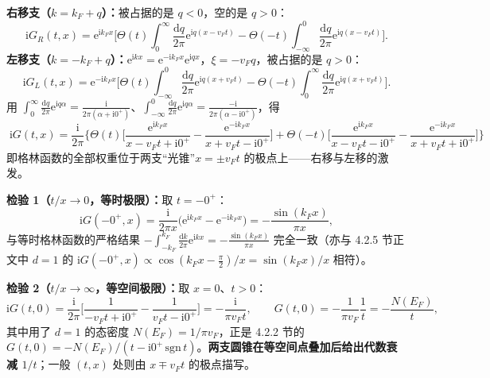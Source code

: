 \textbf{右移支（$k=k_F+q$）：}被占据的是 $q<0$，空的是 $q>0$：
\begin{equation*}
\mathrm{i}G_R(t,x)=\mathrm{e}^{\mathrm{i}k_Fx}\Big[\Theta(t)\!\int_0^\infty\!\frac{\mathrm{d}q}{2\pi}\mathrm{e}^{\mathrm{i}q(x-v_Ft)}
-\Theta(-t)\!\int_{-\infty}^0\!\frac{\mathrm{d}q}{2\pi}\mathrm{e}^{\mathrm{i}q(x-v_Ft)}\Big].
\end{equation*}
\textbf{左移支（$k=-k_F+q$）：}$\mathrm{e}^{\mathrm{i}kx}=\mathrm{e}^{-\mathrm{i}k_Fx}\mathrm{e}^{\mathrm{i}qx}$，$\xi=-v_Fq$，被占据的是 $q>0$：
\begin{equation*}
\mathrm{i}G_L(t,x)=\mathrm{e}^{-\mathrm{i}k_Fx}\Big[\Theta(t)\!\int_{-\infty}^0\!\frac{\mathrm{d}q}{2\pi}\mathrm{e}^{\mathrm{i}q(x+v_Ft)}
-\Theta(-t)\!\int_0^\infty\!\frac{\mathrm{d}q}{2\pi}\mathrm{e}^{\mathrm{i}q(x+v_Ft)}\Big].
\end{equation*}
用 $\int_0^\infty\frac{\mathrm{d}q}{2\pi}\mathrm{e}^{\mathrm{i}q\alpha}=\frac{\mathrm{i}}{2\pi(\alpha+\mathrm{i}0^+)}$、$\int_{-\infty}^0\frac{\mathrm{d}q}{2\pi}\mathrm{e}^{\mathrm{i}q\alpha}=\frac{-\mathrm{i}}{2\pi(\alpha-\mathrm{i}0^+)}$，得
\begin{equation*}
\boxed{\;\mathrm{i}G(t,x)=\frac{\mathrm{i}}{2\pi}\Big\{\Theta(t)\Big[\frac{\mathrm{e}^{\mathrm{i}k_Fx}}{x-v_Ft+\mathrm{i}0^+}-\frac{\mathrm{e}^{-\mathrm{i}k_Fx}}{x+v_Ft-\mathrm{i}0^+}\Big]
+\Theta(-t)\Big[\frac{\mathrm{e}^{\mathrm{i}k_Fx}}{x-v_Ft-\mathrm{i}0^+}-\frac{\mathrm{e}^{-\mathrm{i}k_Fx}}{x+v_Ft+\mathrm{i}0^+}\Big]\Big\}\;}
\end{equation*}
即格林函数的全部权重位于两支“光锥”$x=\pm v_Ft$ 的极点上——右移与左移的激发。

\textbf{检验 1（$t/x\to0$，等时极限）：}取 $t=-0^+$：
\begin{equation*}
\mathrm{i}G(-0^+,x)=\frac{\mathrm{i}}{2\pi x}\big(\mathrm{e}^{\mathrm{i}k_Fx}-\mathrm{e}^{-\mathrm{i}k_Fx}\big)
=-\frac{\sin(k_Fx)}{\pi x},
\end{equation*}
与等时格林函数的严格结果 $-\int_{-k_F}^{k_F}\frac{\mathrm{d}k}{2\pi}\mathrm{e}^{\mathrm{i}kx}=-\frac{\sin(k_Fx)}{\pi x}$ 完全一致（亦与 4.2.5 节正文中 $d=1$ 的 $\mathrm{i}G(-0^+,x)\propto\cos(k_Fx-\frac{\pi}{2})/x=\sin(k_Fx)/x$ 相符）。

\textbf{检验 2（$t/x\to\infty$，等空间极限）：}取 $x=0$、$t>0$：
\begin{equation*}
\mathrm{i}G(t,0)=\frac{\mathrm{i}}{2\pi}\Big[\frac{1}{-v_Ft+\mathrm{i}0^+}-\frac{1}{v_Ft-\mathrm{i}0^+}\Big]
=-\frac{\mathrm{i}}{\pi v_Ft},
\qquad
G(t,0)=-\frac{1}{\pi v_F}\frac{1}{t}=-\frac{N(E_F)}{t},
\end{equation*}
其中用了 $d=1$ 的态密度 $N(E_F)=1/\pi v_F$，正是 4.2.2 节的 $G(t,0)=-N(E_F)/(t-\mathrm{i}0^+\,\mathrm{sgn}\,t)$。\textbf{两支圆锥在等空间点叠加后给出代数衰减 $1/t$}；一般 $(t,x)$ 处则由 $x\mp v_Ft$ 的极点描写。

